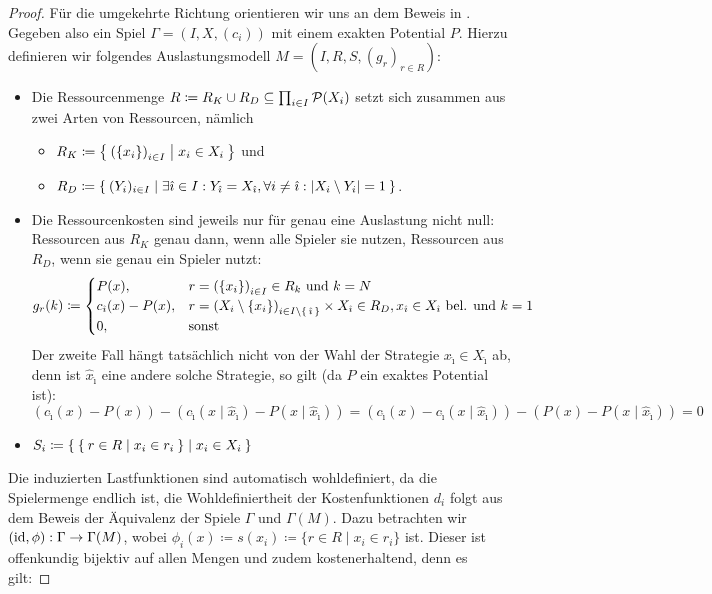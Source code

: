 \begin{proof}
		
	Für die umgekehrte Richtung orientieren wir uns an dem Beweis in \cite[Theorem 1]{MultiPotGames}. Gegeben also ein Spiel $\Gamma = (I, X, (c_i))$ mit einem exakten Potential $P$. Hierzu definieren wir folgendes Auslastungsmodell $M = (I, R, S, (g_r)_{r \in R})$:
	\begin{itemize}
		\item Die Ressourcenmenge $R \coloneqq R_K \cup R_D \subseteq \prod_{i \in I}\mathcal{P}(X_i)$ setzt sich zusammen aus zwei Arten von Ressourcen, nämlich 
			\begin{itemize}
				\item $R_K \coloneqq \Set{\left(\{x_i\}\right)_{i \in I} | x_i \in X_i }$ und 
				\item $R_D \coloneqq \Set{(Y_i)_{i \in I} | \exists \hat{\imath} \in I: Y_{\hat{\imath}} = X_{\hat{\imath}}, \forall i \neq \hat{\imath}: \left|X_i \setminus Y_i\right| = 1 }$.
			\end{itemize}
		\item Die Ressourcenkosten sind jeweils nur für genau eine Auslastung nicht null: Ressourcen aus $R_K$ genau dann, wenn alle Spieler sie nutzen, Ressourcen aus $R_D$, wenn sie genau ein Spieler nutzt:
				\[g_r(k) \coloneqq 
					\begin{cases}
						P(x), 					&r = \left(\{x_i\}\right)_{i \in I} \in R_k 													\text{ und } k=N \\
						c_{\hat{\imath}}(x) - P(x), 	&r = \left(X_i\setminus\{x_i\}\right)_{i \in I\setminus\set{\hat{\imath}}} \times X_{\hat{\imath}} \in R_D, x_{\hat{\imath}} \in X_{\hat{\imath}} \text{ bel. und } k=1 \\
						0,						&\text{sonst}
					\end{cases}
				\]
			Der zweite Fall hängt tatsächlich nicht von der Wahl der Strategie $x_{\hat{\imath}} \in X_{\hat{\imath}}$ ab, denn ist $\hat{x}_{\hat{\imath}}$ eine andere solche Strategie, so gilt (da $P$ ein exaktes Potential ist):
			\[\left(c_{\hat{\imath}}(x) - P(x)\right) - \left(c_{\hat{\imath}}(x \mid \hat{x}_{\hat{\imath}}) - P(x \mid \hat{x}_{\hat{\imath}})\right) = \left(c_{\hat{\imath}}(x) - c_{\hat{\imath}}(x \mid \hat{x}_{\hat{\imath}})\right) - \left(P(x) - P(x \mid \hat{x}_{\hat{\imath}})\right) = 0\]
		\item $S_i \coloneqq \Set{ \Set{r \in R | x_i \in r_i} | x_i \in X_i }$
	\end{itemize}
	Die induzierten Lastfunktionen sind automatisch wohldefiniert, da die Spielermenge endlich ist, die Wohldefiniertheit der Kostenfunktionen $d_i$ folgt aus dem Beweis der Äquivalenz der Spiele $\Gamma$ und $\Gamma(M)$. Dazu betrachten wir $(\mathrm{id}, \phi): \Gamma \to \Gamma(M)$, wobei $\phi_i(x) \coloneqq s(x_i) \coloneqq \{r \in R \mid x_i \in r_i\}$ ist. Dieser ist offenkundig bijektiv auf allen Mengen und zudem kostenerhaltend, denn es gilt:

\end{proof}
